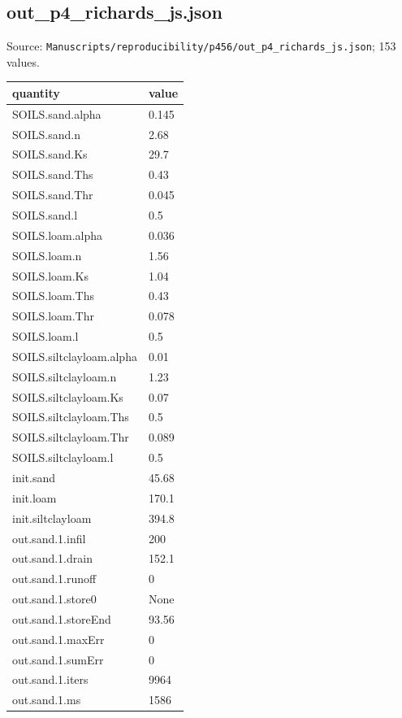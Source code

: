 \subsection*{out\_p4\_richards\_js.json}
\noindent\small Source: \nolinkurl{Manuscripts/reproducibility/p456/out_p4_richards_js.json}; 153 values.\par
{\scriptsize\begin{longtable}{p{}p{}}\toprule\textbf{quantity} & \textbf{value}\\\midrule\endhead
{}SOILS.sand.alpha & 0.145\\
{}SOILS.sand.n & 2.68\\
{}SOILS.sand.Ks & 29.7\\
{}SOILS.sand.Ths & 0.43\\
{}SOILS.sand.Thr & 0.045\\
{}SOILS.sand.l & 0.5\\
{}SOILS.loam.alpha & 0.036\\
{}SOILS.loam.n & 1.56\\
{}SOILS.loam.Ks & 1.04\\
{}SOILS.loam.Ths & 0.43\\
{}SOILS.loam.Thr & 0.078\\
{}SOILS.loam.l & 0.5\\
{}SOILS.siltclayloam.alpha & 0.01\\
{}SOILS.siltclayloam.n & 1.23\\
{}SOILS.siltclayloam.Ks & 0.07\\
{}SOILS.siltclayloam.Ths & 0.5\\
{}SOILS.siltclayloam.Thr & 0.089\\
{}SOILS.siltclayloam.l & 0.5\\
{}init.sand & 45.68\\
{}init.loam & 170.1\\
{}init.siltclayloam & 394.8\\
{}out.sand.1.infil & 200\\
{}out.sand.1.drain & 152.1\\
{}out.sand.1.runoff & 0\\
{}out.sand.1.store0 & None\\
{}out.sand.1.storeEnd & 93.56\\
{}out.sand.1.maxErr & 0\\
{}out.sand.1.sumErr & 0\\
{}out.sand.1.iters & 9964\\
{}out.sand.1.ms & 1586\\

\end{longtable}}
